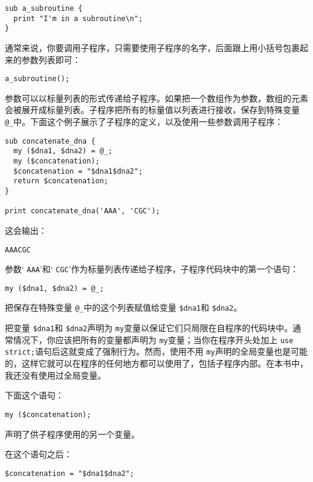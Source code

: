 \begin{lstlisting}
sub a_subroutine {
  print "I'm in a subroutine\n";
}
\end{lstlisting}

通常来说，你要调用子程序，只需要使用子程序的名字，后面跟上用小括号包裹起来的参数列表即可：

\begin{lstlisting}
a_subroutine();
\end{lstlisting}

参数可以以标量列表的形式传递给子程序。如果把一个数组作为参数，数组的元素会被展开成标量列表。子程序把所有的标量值以列表进行接收，保存到特殊变量 \verb|@_|中。下面这个例子展示了子程序的定义，以及使用一些参数调用子程序：

\begin{lstlisting}
sub concatenate_dna {
  my ($dna1, $dna2) = @_;
  my ($concatenation);
  $concatenation = "$dna1$dna2";
  return $concatenation;
}

print concatenate_dna('AAA', 'CGC');
\end{lstlisting}

这会输出：

\begin{lstlisting}
AAACGC
\end{lstlisting}

参数` \verb|AAA|'和` \verb|CGC|'作为标量列表传递给子程序，子程序代码块中的第一个语句：

\begin{lstlisting}
my ($dna1, $dna2) = @_;
\end{lstlisting}

把保存在特殊变量 \verb|@_|中的这个列表赋值给变量 \verb|$dna1|和 \verb|$dna2|。

把变量 \verb|$dna1|和 \verb|$dna2|声明为 \verb|my|变量以保证它们只局限在自程序的代码块中。通常情况下，你应该把所有的变量都声明为 \verb|my|变量；当你在程序开头处加上 \verb|use strict;|语句后这就变成了强制行为。然而，使用不用 \verb|my|声明的全局变量也是可能的，这样它就可以在程序的任何地方都可以使用了，包括子程序内部。在本书中，我还没有使用过全局变量。

下面这个语句：

\begin{lstlisting}
my ($concatenation);
\end{lstlisting}

声明了供子程序使用的另一个变量。

在这个语句之后：

\begin{lstlisting}
$concatenation = "$dna1$dna2"; 
\end{lstlisting}

